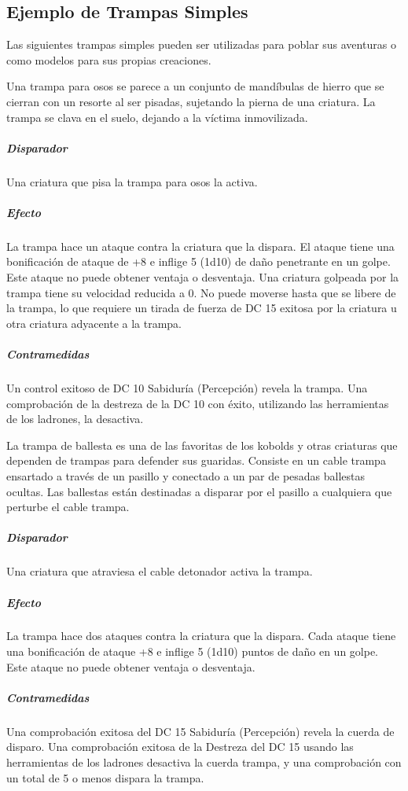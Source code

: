 \documentclass[a4paper,twocolumn,openany,10pt]{dndbook}
\begin{document}
\subsection*{Ejemplo de Trampas Simples}
Las siguientes trampas simples pueden ser utilizadas para poblar sus aventuras o como modelos para sus propias creaciones. 


Una trampa para osos se parece a un conjunto de mandíbulas de hierro que se cierran con un resorte al ser pisadas, sujetando la
pierna de una criatura. La trampa se clava en el suelo, dejando a la víctima inmovilizada.

\subparagraph{Disparador} Una criatura que pisa la trampa para osos la activa.

\subparagraph{Efecto} La trampa hace un ataque contra la criatura que la dispara. El ataque tiene una bonificación de ataque de
+8 e inflige 5 (1d10) de daño penetrante en un golpe. Este ataque no puede obtener ventaja o desventaja. Una criatura golpeada
por la trampa tiene su velocidad reducida a 0. No puede moverse hasta que se libere de la trampa, lo que requiere un tirada de
fuerza de DC 15 exitosa por la criatura u otra criatura adyacente a la trampa.

\subparagraph{Contramedidas} Un control exitoso de DC 10 Sabiduría (Percepción) revela la trampa. Una comprobación de la destreza
de la DC 10 con éxito, utilizando las herramientas de los ladrones, la desactiva. 

La trampa de ballesta es una de las favoritas de los kobolds y otras criaturas que dependen de trampas para defender sus
guaridas. Consiste en un cable trampa ensartado a través de un pasillo y conectado a un par de pesadas ballestas ocultas. Las
ballestas están destinadas a disparar por el pasillo a cualquiera que perturbe el cable trampa.

\subparagraph{Disparador} Una criatura que atraviesa el cable detonador activa la trampa.

\subparagraph{Efecto} La trampa hace dos ataques contra la criatura que la dispara. Cada ataque tiene una bonificación de ataque
+8 e inflige 5 (1d10) puntos de daño en un golpe. Este ataque no puede obtener ventaja o desventaja.

\subparagraph{Contramedidas} Una comprobación exitosa del DC 15 Sabiduría (Percepción) revela la cuerda de disparo. Una
comprobación exitosa de la Destreza del DC 15 usando las herramientas de los ladrones desactiva la cuerda trampa, y una
comprobación con un total de 5 o menos dispara la trampa. 
\end{document}
